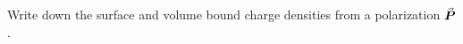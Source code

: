 

\vspace*{\fill}
\centering

Write down the surface and volume bound charge densities from a polarization $\va*{P}$.

\centering
\vspace*{\fill}

